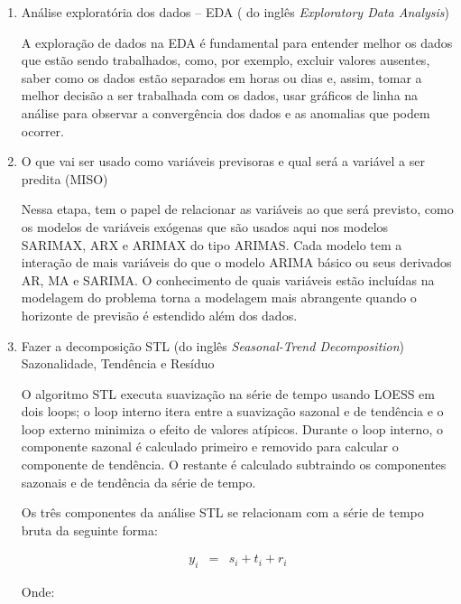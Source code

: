     \begin{enumerate}[start=1, label = {\textbf{Etapa} \arabic* } ]
    	\item Análise exploratória dos dados – EDA ( do inglês \textit{Exploratory Data Analysis}) \label{etp:1}
    	
    	A exploração de dados na EDA é fundamental para entender melhor os dados que estão sendo trabalhados, como, por exemplo, excluir valores ausentes, saber como os dados estão separados em horas ou dias e, assim, tomar a melhor decisão a ser trabalhada com os dados, usar gráficos de linha na análise para observar a convergência dos dados e as anomalias que podem ocorrer.
    	
        	
    	\item O que vai ser usado como variáveis previsoras e qual será a variável a ser predita (MISO) \label{etp:2}
    	
    	Nessa etapa, tem o papel de relacionar as variáveis ao que será previsto, como os modelos de variáveis exógenas que são usados aqui nos modelos SARIMAX, ARX e ARIMAX do tipo ARIMAS. Cada modelo tem a interação de mais variáveis do que o modelo ARIMA básico ou seus derivados AR, MA e SARIMA. O conhecimento de quais variáveis estão incluídas na modelagem do problema torna a modelagem mais abrangente quando o horizonte de previsão é estendido além dos dados.
    	
       	
    	\item Fazer a decomposição STL (do inglês \textit{Seasonal-Trend Decomposition}) Sazonalidade, Tendência e Resíduo \label{etp:3}
    	
        O algoritmo STL executa suavização na série de tempo usando LOESS em dois loops; o loop interno itera entre a suavização sazonal e de tendência e o loop externo minimiza o efeito de valores atípicos. Durante o loop interno, o componente sazonal é calculado primeiro e removido para calcular o componente de tendência. O restante é calculado subtraindo os componentes sazonais e de tendência da série de tempo.
        
        Os três componentes da análise STL se relacionam com a série de tempo bruta da seguinte forma:
        
        \begin{eqnarray}
        	y_i &=& s_i + t_i + r_i
        \end{eqnarray}
    	
    	Onde:
    	

\end{enumerate}
